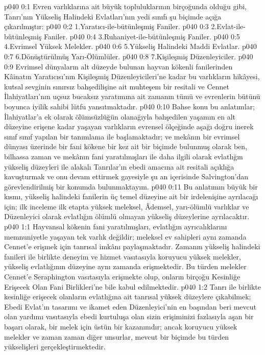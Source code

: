 \vs p040 0:1 Evren varlıklarına ait büyük topluluklarının birçoğunda olduğu gibi, Tanrı’nın Yükseliş Halindeki Evlatları’nın yedi sınıfı şu biçimde açığa çıkarılmıştır:
\vs p040 0:2 1.\bibnobreakspace Yaratıcı\hyp{}ile\hyp{}bütünleşmiş Faniler.
\vs p040 0:3 2.\bibnobreakspace Evlat\hyp{}ile\hyp{}bütünleşmiş Faniler.
\vs p040 0:4 3.\bibnobreakspace Ruhaniyet\hyp{}ile\hyp{}bütünleşmiş Faniler.
\vs p040 0:5 4.\bibnobreakspace Evrimsel Yüksek Melekler.
\vs p040 0:6 5.\bibnobreakspace Yükseliş Halindeki Maddi Evlatlar.
\vs p040 0:7 6.\bibnobreakspace Dönüştürülmüş Yarı\hyp{}Ölümlüler.
\vs p040 0:8 7.\bibnobreakspace Kişileşmiş Düzenleyiciler.
\vs p040 0:9 Evrimsel dünyaların alt düzeyde bulunan hayvan kökenli fanilerinden Kâinatın Yaratıcısı’nın Kişileşmiş Düzenleyicileri’ne kadar bu varlıkların hikâyesi, kutsal sevginin sınırsız bahşedilişine ait muhteşem bir resitali ve Cennet İlahiyatları’nın uçsuz bucaksız yaratımına ait zamanın tümü ve evrenlerin bütünü boyunca iyilik sahibi lütfu yansıtmaktadır.
\vs p040 0:10 Bahse konu bu anlatımlar; İlahiyatlar’a ek olarak ölümsüzlüğün olanağıyla bahşedilen yaşamın en alt düzeyine erişene kadar yaşayan varlıkların evrensel ölçeğinde aşağı doğru inerek sınıf sınıf yapılan bir tanımlama ile başlamaktadır; ve mekânın bir evrimsel dünyası üzerinde bir fani kökene bir kez ait bir biçimde bulunmuş olarak ben, bilhassa zaman ve mekânın fani yaratılmışları ile daha ilgili olarak evlatlığın yükseliş düzeyleri ile alakalı Tanrılar’ın ebedi amacına ait resitali açıklığa kavuşturmak ve onu devam ettirmek gayesiyle şu an içerisinde Salvington’dan görevlendirilmiş bir konumda bulunmaktayım.
\vs p040 0:11 Bu anlatımın büyük bir kısmı, yükseliş halindeki fanilerin üç temel düzeyine ait bir irdelenişine ayrılacağı için; ilk inceleme ilk etapta yüksek meleksel, Âdemsel, yarı\hyp{}ölümlü varlıklar ve Düzenleyici olarak evlatlığın ölümlü olmayan yükseliş düzeylerine ayrılacaktır.
\vs p040 1:1 Hayvansal kökenin fani yaratılmışları, evlatlığın ayrıcalıklarını memnuniyetle yaşayan tek varlık değildir; meleksel ev sahipleri aynı zamanda Cennet’e erişmek için tanrısal imkânı paylaşmaktadır. Zamanın yükseliş halindeki fanileri ile birlikte deneyim ve hizmet vasıtasıyla koruyucu yüksek melekler, yükseliş evlatlığının düzeyine aynı zamanda erişmektedir. Bu türden melekler Cennet’e Seraphington vasıtasıyla erişmekte olup, onların birçoğu Kesinliğe Erişecek Olan Fani Birlikleri’ne bile kabul edilmektedir.
\vs p040 1:2 Tanrı ile birlikte kesinliğe erişecek olanların evlatlığına ait tanrısal yüksek düzeylere çıkabilmek; Ebedi Evlat’ın tasarımı ve ikamet eden Düzenleyici’nin en başından beri mevcut olan yardımı vasıtasıyla ebedi kurtuluşa olan sizin erişiminizi fazlasıyla aşan bir başarı olarak, bir melek için üstün bir kazanımdır; ancak koruyucu yüksek melekler ve zaman zaman diğer unsurlar, mevcut bir biçimde bu türden yükselişleri gerçekleştirmektedir.
